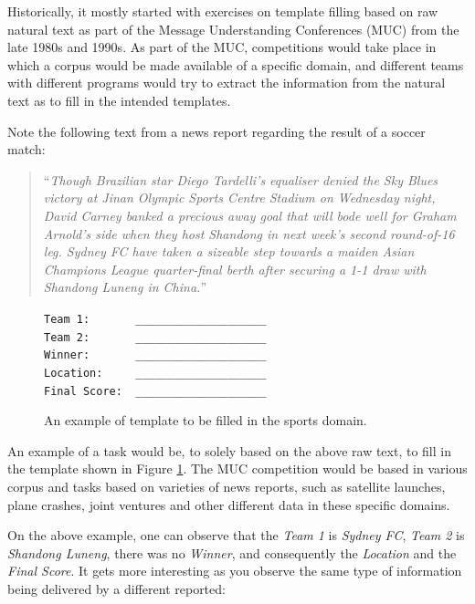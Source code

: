 \documentclass[11pt,a4paper,openright]{memoir}
\begin{document}
Historically, it mostly started with exercises on template filling based on raw natural text \cite{Moens:2006:IEA:1177314} as part of the Message Understanding Conferences (MUC) from the late 1980s and 1990s. As part of the MUC, competitions would take place in which a corpus would be made available of a specific domain, and different teams with different programs would try to extract the information from the natural text as to fill in the intended templates.

Note the following text from a news report regarding the result of a soccer match:

\blockquote{\enquote{\emph{Though Brazilian star Diego Tardelli's equaliser denied the Sky Blues victory at Jinan Olympic Sports Centre Stadium on Wednesday night, David Carney banked a precious away goal that will bode well for Graham Arnold's side when they host Shandong in next week's second round-of-16 leg. Sydney FC have taken a sizeable step towards a maiden Asian Champions League quarter-final berth after securing a 1-1 draw with Shandong Luneng in China.}}}

\begin{figure}[!htbp]
  \centering
  \RaggedRight
    \texttt{Team 1:\ \ \ \ \ \ \ \_\_\_\_\_\_\_\_\_\_\_\_\_\_\_\_\_\_\_\_} \\
    \texttt{Team 2:\ \ \ \ \ \ \ \_\_\_\_\_\_\_\_\_\_\_\_\_\_\_\_\_\_\_\_} \\
    \texttt{Winner:\ \ \ \ \ \ \ \_\_\_\_\_\_\_\_\_\_\_\_\_\_\_\_\_\_\_\_} \\
    \texttt{Location:\ \ \ \ \ \_\_\_\_\_\_\_\_\_\_\_\_\_\_\_\_\_\_\_\_} \\
    \texttt{Final Score:\ \ \_\_\_\_\_\_\_\_\_\_\_\_\_\_\_\_\_\_\_\_} \\
  \caption[An example of template to be filled in the sports domain.]{An example of template to be filled in the sports domain.}
  \label{fig:template_to_be_filled}
\end{figure}

An example of a task would be, to solely based on the above raw text, to fill in the template shown in Figure \ref{fig:template_to_be_filled}. The MUC competition would be based in various corpus and tasks based on varieties of news reports, such as satellite launches, plane crashes, joint ventures and other different data in these specific domains.

On the above example, one can observe that the \emph{Team 1} is \emph{Sydney FC}, \emph{Team 2} is \emph{Shandong Luneng}, there was no \emph{Winner}, and consequently the \emph{Location} and the \emph{Final Score}. It gets more interesting as you observe the same type of information being delivered by a different reported:
\end{document}
